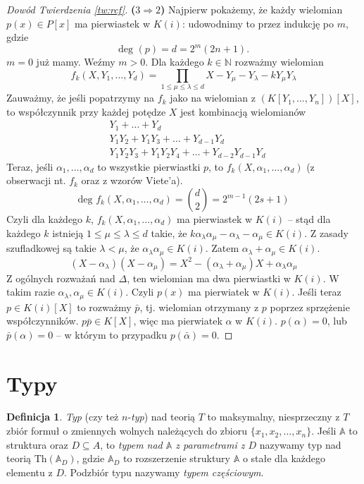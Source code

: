 \documentclass{article}
\newcommand{\N}{\mathbb{N}}
\newcommand{\A}{\mathbb{A}}
\theoremstyle{plain}
\theoremstyle{definition}
\newtheorem{df}[thm]{Definicja}
\theoremstyle{remark}
\newcommand{\Th}{\text{Th}}
\begin{document}
\begin{proof}[Dowód Twierdzenia \ref{tw:rcf}]
	\textbf{($3 \Rightarrow 2$)}
	Najpierw pokażemy, że każdy wielomian $p(x) \in P[x]$ ma pierwiastek w
	$K(i)$: udowodnimy to przez indukcję po $m$, gdzie
	$$\text{deg }(p) = d = 2^m(2n + 1).$$
	$m = 0$ już mamy. Weźmy $m > 0$.
	Dla każdego $k \in \N$ rozważmy wielomian
	\[
		f_k(X, Y_1, \ldots, Y_d) =
		\prod_{1 \leq \mu \leq \lambda \leq d}
		X - Y_\mu - Y_\lambda - k Y_\mu Y_\lambda
	\]
	Zauważmy, że jeśli popatrzymy na $f_k$ jako na wielomian z
	$(K[Y_1, \ldots, Y_n])[X]$, to współczynnik przy każdej potędze $X$
	jest kombinacją wielomianów
	\begin{align*}
		&Y_1 + \ldots + Y_d \\
		&Y_1 Y_2 + Y_1 Y_3 + \ldots + Y_{d-1} Y_d \\
		&Y_1 Y_2 Y_3 + Y_1 Y_2 Y_4 + \ldots + Y_{d-2} Y_{d-1} Y_d
	\end{align*}
	Teraz, jeśli $\alpha_1, \ldots, \alpha_d$ to wszystkie pierwiastki
	$p$, to $f_k(X, \alpha_1, \ldots, \alpha_d)$ %
	(z obserwacji nt. $f_k$ oraz z wzorów Viete'a).
	\[
		\text{deg } f_k(X, \alpha_1, \ldots, \alpha_d) = {d \choose 2} =
		2^{m-1}(2s + 1)
	\]
	Czyli dla każdego $k$, $f_k(X, \alpha_1, \ldots, \alpha_d)$ ma
	pierwiastek w $K(i)$ -- stąd dla każdego $k$ istnieją
	$1 \leq \mu \leq \lambda \leq d$ takie, że
	$k \alpha_\lambda \alpha_\mu - \alpha_\lambda - \alpha_\mu \in K(i)$.
	Z zasady szufladkowej są takie $\lambda < \mu$, że
	$\alpha_\lambda \alpha_\mu \in K(i)$. Zatem
	$\alpha_\lambda + \alpha_\mu \in K(i)$.
	\begin{equation}
		(X - \alpha_\lambda) (X - \alpha_\mu) =
		X^2 - (\alpha_\lambda + \alpha_\mu) X + \alpha_\lambda \alpha_\mu
	\end{equation}
	Z ogólnych rozważań nad $\Delta$, ten wielomian ma dwa pierwiastki
	w $K(i)$. W takim razie $\alpha_\lambda, \alpha_\mu \in K(i)$.
	Czyli $p(x)$ ma pierwiatek w $K(i)$. Jeśli teraz $p \in K(i)[X]$ to
	rozważmy $\bar{p}$, tj. wielomian otrzymany z $p$ poprzez sprzężenie
	współczynników. $p \bar{p} \in K[X]$, więc ma pierwiatek $\alpha$
	w $K(i)$. $p(\alpha) = 0$, lub $\bar{p}(\alpha) = 0$ -- w którym to
	przypadku $p(\bar{\alpha}) = 0$.
\end{proof}

\section{Typy}

\begin{df}
	\textit{Typ} (czy też $n$-\textit{typ}) nad teorią $T$ to maksymalny, niesprzeczny z $T$ zbiór formuł o zmiennych wolnych należących do zbioru $\{x_1, x_2, \ldots, x_n\}$.
		Jeśli $\A$ to struktura oraz $D \subseteq A$, to \textit{typem nad $\A$ z parametrami z $D$} nazywamy typ nad teorią $\Th(\A_D)$, gdzie $\A_D$ to rozszerzenie struktury $\A$ o stałe dla każdego elementu z $D$.
		Podzbiór typu nazywamy \textit{typem częściowym}.
\end{df}
\end{document}
